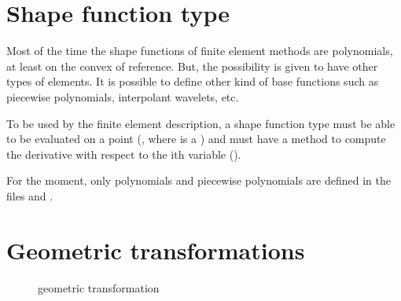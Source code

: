 \documentclass[a4paper,11pt,english]{sphinxmanual}
\begin{document}
\section{Shape function type}
\label{\detokenize{project/femdesc:shape-function-type}}
Most of the time the shape functions of finite element methods are polynomials,
at least on the convex of reference. But, the possibility is given to have other
types of elements. It is possible to define other kind of base functions such as
piecewise polynomials, interpolant wavelets, etc.

To be used by the finite element description, a shape function type must be able
to be evaluated on a point (, where  is a )
and must have a method to compute the derivative with respect to the ith variable
().

For the moment, only polynomials and piecewise polynomials are defined in the
files  and .


\section{Geometric transformations}
\label{\detokenize{project/femdesc:geometric-transformations}}\label{\detokenize{project/femdesc:dp-transgeo}}
\begin{figure}[htbp]
\centering
\capstart

\noindent{}
\caption{geometric transformation}\label{\detokenize{project/femdesc:id2}}\label{\detokenize{project/femdesc:dp-fig-transgeo}}\end{figure}
\end{document}
